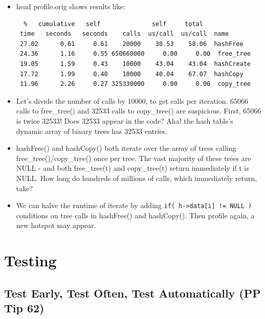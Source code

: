 \documentclass[aspectratio=169]{beamer}
\newcommand{\pitem}{\pause \item}
\begin{document}
\begin{frame}[fragile]
    \begin{itemize}
    \item
      \alert{head profile.orig} shows results like:
\small
\begin{verbatim}
  %   cumulative   self              self     total
 time   seconds   seconds    calls  us/call  us/call  name
 27.02      0.61     0.61    20000    30.53    58.06  hashFree
 24.36      1.16     0.55 650660000     0.00     0.00  free_tree
 19.05      1.59     0.43    10000    43.04    43.04  hashCreate
 17.72      1.99     0.40    10000    40.04    67.07  hashCopy
 11.96      2.26     0.27 325330000     0.00     0.00  copy_tree
\end{verbatim}
    \pitem
    Let's divide the number of calls by 10000, to get calls per iteration.
    65066 calls to \alert{free\_tree()} and
    32533 calls to \alert{copy\_tree()} are suspicious.
    \pause
    First, 65066 is twice 32533!
    Does 32533 appear in the code?
    \pause
    Aha! the hash table's \alert{dynamic array of binary trees}
    has 32533 entries.
    \pitem
    \alert{hashFree()} and \alert{hashCopy()} both
    iterate over the array of trees calling \alert{free\_tree()/copy\_tree()} once per tree.
    The \alert{vast majority} of these trees are \alert{NULL} - and both
    \alert{free\_tree(t)} and \alert{copy\_tree(t)} return immediately if \alert{t} is NULL.
    \pause
    How long do hundreds of millions of calls, which immediately return, take?

    \pitem
    We can \alert{halve the runtime} of \alert{iterate} by adding
    \verb+if( h->data[i] != NULL )+ conditions on tree calls
    in \alert{hashFree()} and \alert{hashCopy()}.
    \pause
    Then profile again, a new hotspot may appear.
    \end{itemize}
\end{frame}

\section{Testing}
\subsection{Test Early, Test Often, Test Automatically (PP Tip 62)}
\end{document}
